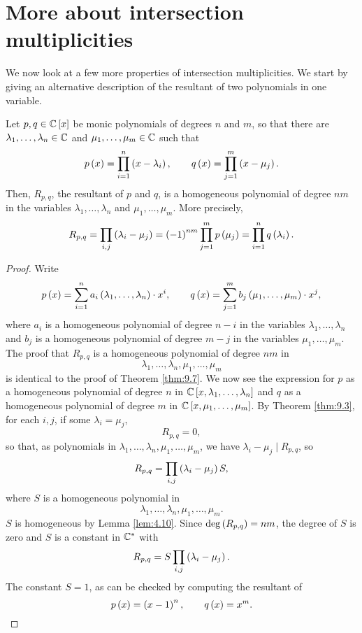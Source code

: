 \pagebreak

\section{More about intersection multiplicities}

We now look at a few more properties of intersection multiplicities. We start by giving an alternative description of the resultant of two polynomials in one variable.

\begin{lemma}
\label{lem:12.1}
Let $ p, q \in \mathbb{C}\left[ x \right] $ be monic polynomials of degrees $ n $ and $ m $, so that there are $ \lambda_1, \dots, \lambda_n \in \mathbb{C} $ and $ \mu_1, \dots, \mu_m  \in \mathbb{C} $ such that
$$ p\left( x \right) = \prod_{i = 1}^n \left( x - \lambda_i \right), \qquad q\left( x \right) = \prod_{j = 1}^m \left( x - \mu_j \right). $$
Then, $ R_{p, q} $, the resultant of $ p $ and $ q $, is a homogeneous polynomial of degree $ nm $ in the variables $ \lambda_1, \dots, \lambda_n $ and $ \mu_1, \dots, \mu_m $. More precisely,
$$ R_{p, q} = \prod_{i, j}\left( \lambda_i - \mu_j \right) = \left( -1 \right)^{nm}\prod_{j = 1}^m p\left( \mu_j \right) = \prod_{i = 1}^n q\left( \lambda_i \right). $$
\end{lemma}

\begin{proof}
Write
$$ p\left( x \right) = \sum_{i = 1}^n a_i\left( \lambda_1, \dots, \lambda_n \right) \cdot x^i, \qquad q\left( x \right) = \sum_{j = 1}^m b_j\left( \mu_1, \dots, \mu_m \right) \cdot x^j, $$
where $ a_i $ is a homogeneous polynomial of degree $ n - i $ in the variables $ \lambda_1, \dots, \lambda_n $ and $ b_j $ is a homogeneous polynomial of degree $ m - j $ in the variables $ \mu_1, \dots, \mu_m $. The proof that $ R_{p, q} $ is a homogeneous polynomial of degree $ nm $ in
$$ \lambda_1, \dots, \lambda_n, \mu_1, \dots, \mu_m $$
is identical to the proof of Theorem \ref{thm:9.7}. We now see the expression for $ p $ as a homogeneous polynomial of degree $ n $ in $ \mathbb{C}\left[ x, \lambda_1, \dots, \lambda_n \right] $ and $ q $ as a homogeneous polynomial of degree $ m $ in $ \mathbb{C}\left[ x, \mu_1, \dots, \mu_m \right] $. By Theorem \ref{thm:9.3}, for each $ i, j $, if some $ \lambda_i = \mu_j $,
$$ R_{p, q} = 0, $$
so that, as polynomials in $ \lambda_1, \dots, \lambda_n, \mu_1, \dots, \mu_m $, we have $ \lambda_i - \mu_j \mid R_{p, q} $, so
$$ R_{p, q} = \prod_{i, j} \left( \lambda_i - \mu_j \right)S, $$
where $ S $ is a homogeneous polynomial in
$$ \lambda_1, \dots, \lambda_n, \mu_1, \dots, \mu_m. $$
$ S $ is homogeneous by Lemma \ref{lem:4.10}. Since $ \deg\left( R_{p, q} \right) = nm $, the degree of $ S $ is zero and $ S $ is a constant in $ \mathbb{C}^* $ with
$$ R_{p, q} = S\prod_{i, j} \left( \lambda_i - \mu_j \right). $$
The constant $ S = 1 $, as can be checked by computing the resultant of
$$ p\left( x \right) = \left( x - 1 \right)^n, \qquad q\left( x \right) = x^m. $$
\end{proof}

